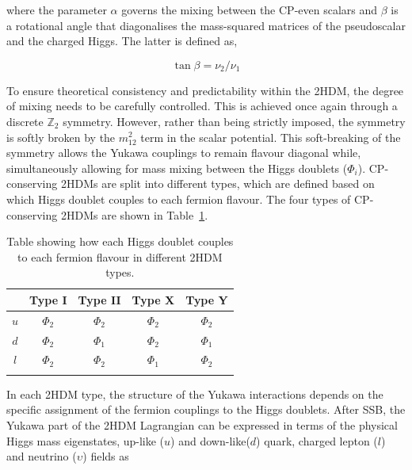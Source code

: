 where the parameter $\alpha$ governs the mixing between the CP-even scalars and $\beta$ is a rotational angle that diagonalises the mass-squared matrices of the pseudoscalar and the charged Higgs. The latter is defined as,

\begin{equation}
    \tan{\beta} = \nu_2/\nu_1
\end{equation}

To ensure theoretical consistency and predictability within the 2HDM, the degree of mixing needs to be carefully controlled. This is achieved once again through a discrete $\mathbb{Z}_2$ symmetry. However, rather than being strictly imposed, the symmetry is softly broken by the $m_{12}^2$ term in the scalar potential. This soft-breaking of the symmetry allows the Yukawa couplings to remain flavour diagonal while, simultaneously allowing for mass mixing between the Higgs doublets ($\Phi_i$). CP-conserving 2HDMs are split into different types, which are defined based on which Higgs doublet couples to each fermion flavour. The four types of CP-conserving 2HDMs are shown in Table~\ref{Table:Chapter2_2HDM-Types}.

\begin{table}[h]
\centering
\renewcommand{\arraystretch}{1.5} %
\setlength{\tabcolsep}{12pt} %
\begin{tabular}{|c|c|c|c|c|}
\hline
    & Type I   & Type II  & Type X   & Type Y   \\ \hline \hline
$u$ & $\Phi_2$ & $\Phi_2$ & $\Phi_2$ & $\Phi_2$ \\ 
\arrayrulecolor{lightgray} \hline
$d$ & $\Phi_2$ & $\Phi_1$ & $\Phi_2$ & $\Phi_1$ \\ 
\arrayrulecolor{lightgray} \hline
$l$ & $\Phi_2$ & $\Phi_2$ & $\Phi_1$ & $\Phi_2$ \\ 
\arrayrulecolor{black} \hline
\end{tabular}
\caption{Table showing how each Higgs doublet couples to each fermion flavour in different 2HDM types.}
\label{Table:Chapter2_2HDM-Types}
\end{table}

In each 2HDM type, the structure of the Yukawa interactions depends on the specific assignment of the fermion couplings to the Higgs doublets. After SSB, the Yukawa part of the 2HDM Lagrangian can be expressed in terms of the physical Higgs mass eigenstates, up-like ($u$) and down-like($d$) quark, charged lepton ($l$) and neutrino ($\upsilon$) fields as

